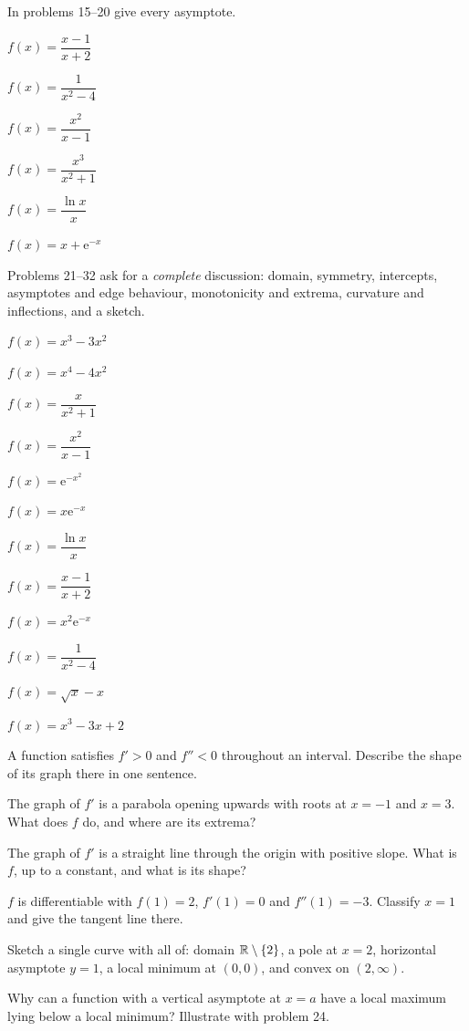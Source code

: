 In problems 15--20 give every asymptote.

\begin{problems}[resume]
  \item $f(x)=\dfrac{x-1}{x+2}$
  \item $f(x)=\dfrac{1}{x^{2}-4}$
  \item $f(x)=\dfrac{x^{2}}{x-1}$
  \item $f(x)=\dfrac{x^{3}}{x^{2}+1}$
  \item $f(x)=\dfrac{\ln x}{x}$
  \item $f(x)=x+\mathrm{e}^{-x}$
\end{problems}

Problems 21--32 ask for a \emph{complete} discussion: domain, symmetry,
intercepts, asymptotes and edge behaviour, monotonicity and extrema,
curvature and inflections, and a sketch.

\begin{problems}[resume]
  \item $f(x)=x^{3}-3x^{2}$
  \item $f(x)=x^{4}-4x^{2}$
  \item $f(x)=\dfrac{x}{x^{2}+1}$
  \item $f(x)=\dfrac{x^{2}}{x-1}$
  \item $f(x)=\mathrm{e}^{-x^{2}}$
  \item $f(x)=x\mathrm{e}^{-x}$
  \item $f(x)=\dfrac{\ln x}{x}$
  \item $f(x)=\dfrac{x-1}{x+2}$
  \item $f(x)=x^{2}\mathrm{e}^{-x}$
  \item $f(x)=\dfrac{1}{x^{2}-4}$
  \item $f(x)=\sqrt{x}-x$
  \item $f(x)=x^{3}-3x+2$
\end{problems}

\begin{problems}[resume]
  \item A function satisfies $f'>0$ and $f''<0$ throughout an interval.
        Describe the shape of its graph there in one sentence.
  \item The graph of $f'$ is a parabola opening upwards with roots at
        $x=-1$ and $x=3$. What does $f$ do, and where are its extrema?
  \item The graph of $f'$ is a straight line through the origin with
        positive slope. What is $f$, up to a constant, and what is its
        shape?
  \item $f$ is differentiable with $f(1)=2$, $f'(1)=0$ and $f''(1)=-3$.
        Classify $x=1$ and give the tangent line there.
  \item Sketch a single curve with all of: domain $\mathbb{R}\setminus\{2\}$, a
        pole at $x=2$, horizontal asymptote $y=1$, a local minimum at
        $(0,0)$, and convex on $(2,\infty)$.
  \item Why can a function with a vertical asymptote at $x=a$ have a local
        maximum lying below a local minimum? Illustrate with problem 24.
\end{problems}

